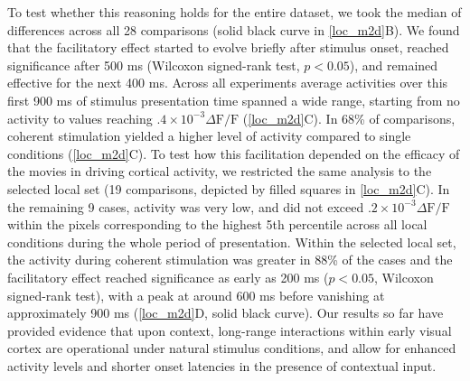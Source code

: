 To test whether this reasoning holds for the entire dataset, we took the
median of differences across all 28 comparisons (solid black curve in
\ref{loc_m2d}B). We found that the facilitatory effect started to evolve briefly
after stimulus onset, reached significance after 500 ms (Wilcoxon
signed-rank test, $p < 0.05$), and remained effective for the next 400 ms.
Across all experiments average activities over this first 900 ms of
stimulus presentation time spanned a wide range, starting from no activity
to values reaching $.4\times10^{-3} \Delta \textrm{F/F}$ (\ref{loc_m2d}C).
In 68\% of comparisons, coherent stimulation yielded a higher level of
activity compared to single conditions (\ref{loc_m2d}C). To test how this
facilitation depended on the efficacy of the movies in driving cortical
activity, we restricted the same analysis to the selected local set (19
comparisons, depicted by filled squares in \ref{loc_m2d}C). In the
remaining 9 cases, activity was very low, and did not exceed
$.2\times10^{-3} \Delta \textrm{F/F}$ within the pixels corresponding to
the highest 5th percentile across all local conditions during the whole
period of presentation. Within the selected local set, the activity during
coherent stimulation was greater in 88\% of the cases and the facilitatory
effect reached significance as early as 200 ms ($p < 0.05$, Wilcoxon
signed-rank test), with a peak at around 600 ms before vanishing at
approximately 900 ms (\ref{loc_m2d}D, solid black curve). Our results so
far have provided evidence that upon context, long-range interactions
within early visual cortex are operational under natural stimulus
conditions, and allow for enhanced activity levels and shorter onset
latencies in the presence of contextual input. 

